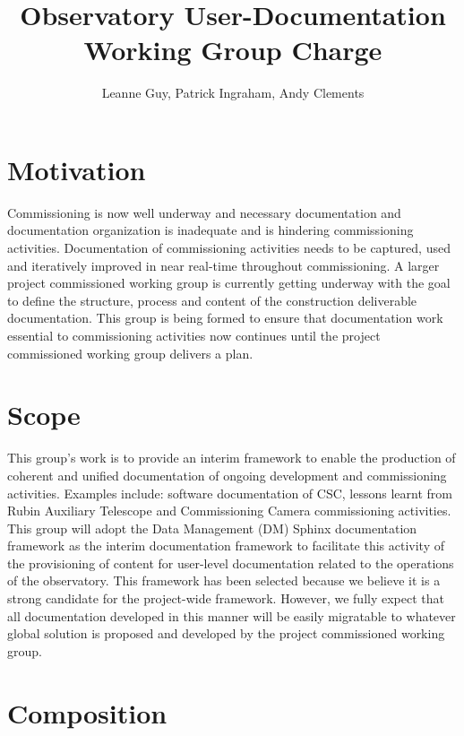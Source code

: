 \documentclass[TS,authoryear,toc]{lsstdoc}
\title{Observatory User-Documentation Working Group Charge}
\author{%
Leanne Guy, Patrick Ingraham, Andy Clements
}
\date{\vcsDate}
\begin{document}
\maketitle



\section{Motivation}

Commissioning is now well underway and necessary documentation and documentation organization is inadequate and is hindering commissioning activities. Documentation of commissioning activities needs to be captured, used and iteratively improved in near real-time throughout commissioning. A larger  project commissioned working group is currently getting underway with the goal to define the structure, process and content of the construction deliverable documentation. This group is being formed to ensure that documentation work essential to commissioning activities now continues until the project commissioned working group delivers a plan. 

\section{Scope}
This group's work is to provide an interim framework to enable the production of coherent and unified documentation of ongoing development and commissioning activities. Examples include: software documentation of CSC, lessons learnt from Rubin Auxiliary Telescope and Commissioning Camera commissioning activities. This group will adopt the Data Management (DM) Sphinx documentation framework as the interim documentation framework to facilitate this activity of the provisioning of content for user-level documentation related to the operations of the observatory. This framework has been selected because we believe it is a strong candidate for the project-wide framework. However, we fully expect that all documentation developed in this manner will be easily migratable to whatever global solution is proposed and developed by the project commissioned working group. 

\section{Composition}
\end{document}
